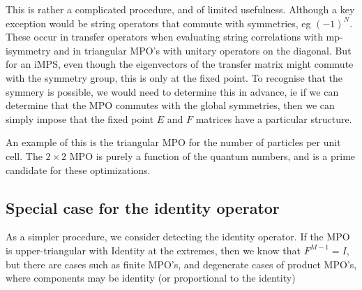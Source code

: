 \documentclass{article}[10pt]
\begin{document}
This is rather a complicated procedure, and of limited usefulness. Although a key exception would be string
operators that commute with symmetries, eg $(-1)^N$. These occur in transfer operators when evaluating string
correlations with mp-isymmetry and in triangular MPO's with unitary operators on the diagonal. But for an iMPS,
even though the eigenvectors of the transfer matrix might commute with the symmetry group, this is only at the
fixed point. To recognise that the symmery is possible, we would need to determine this in advance, ie if we
can determine that the MPO commutes with the global symmetries, then we can simply impose that the fixed point
$E$ and $F$ matrices have a particular structure. 

An example of this is the triangular MPO for the number of particles per unit cell. The $2 \times 2$ MPO is purely
a function of the quantum numbers, and is a prime candidate for these optimizations.  

\subsection{Special case for the identity operator}

As a simpler procedure, we consider detecting the identity operator. If the MPO is upper-triangular with Identity at
the extremes, then we know that $F^{M-1} = I$, but there are cases such as finite MPO's, and degenerate cases of
product MPO's, where components may be identity (or proportional to the identity) 
\end{document}
